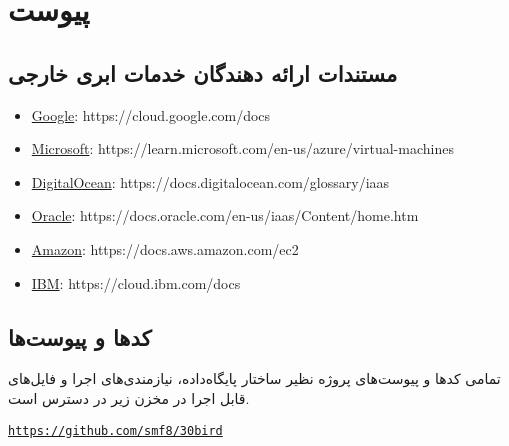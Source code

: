 \chapter*{‌پیوست}

\section*{مستندات ارائه دهندگان خدمات ابری خارجی}
\begin{latin}
\begin{itemize}
	\item \href{https://cloud.google.com/docs}{Google}: https://cloud.google.com/docs
	\item \href{https://learn.microsoft.com/en-us/azure/virtual-machines/}{Microsoft}: https://learn.microsoft.com/en-us/azure/virtual-machines
	\item \href{https://docs.digitalocean.com/glossary/iaas/}{DigitalOcean}: https://docs.digitalocean.com/glossary/iaas
	\item \href{https://docs.oracle.com/en-us/iaas/Content/home.htm}{Oracle}: https://docs.oracle.com/en-us/iaas/Content/home.htm
	\item \href{https://docs.aws.amazon.com/ec2}{Amazon}: https://docs.aws.amazon.com/ec2
	\item \href{https://cloud.ibm.com/docs}{IBM}: https://cloud.ibm.com/docs
\end{itemize}
\end{latin}

\section{کد‌ها و پیوست‌ها}
تمامی‌ کد‌ها و پیوست‌های پروژه نظیر ساختار پایگاه‌داده، نیازمندی‌های اجرا و فایل‌های قابل اجرا در مخزن زیر در دسترس است.

\begin{latin}
	\href{https://github.com/smf8/30bird}{\texttt{https://github.com/smf8/30bird}}
\end{latin}